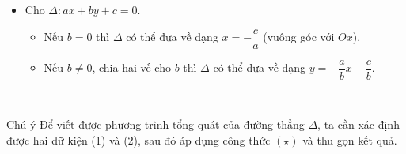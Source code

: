 \begin{itemize}
\begin{minipage}[b]{8cm}
\begin{itemize}
		ta thu gọn $(\star)$ về dạng $ax+by+c=0$.
		\item [\ding{173}] Cho $\Delta \colon ax+by+c=0$. 
		\begin{itemize}
			\item [$\bullet$] Nếu $b=0$ thì $\Delta$ có thể đưa về dạng $x=-\dfrac{c}{a}$ (vuông góc với $Ox$).
			\item [$\bullet$] Nếu $b \ne 0$, chia hai vế cho $b$ thì $\Delta$ có thể đưa về dạng $y=-\dfrac{a}{b}x-\dfrac{c}{b}$.
		\end{itemize}
	\end{itemize}
	\end{minipage}\hspace{2cm}
\begin{minipage}[b]{6cm}
\hspace*{1cm}\\
	\begin{khung4}{Chú ý}
	Để viết được phương trình tổng quát của đường thẳng $\Delta$, ta cần xác định được hai dữ kiện (1) và (2), sau đó áp dụng công thức $(\star)$ và thu gọn kết quả.
\end{khung4}
\end{minipage}
\end{itemize}

